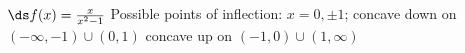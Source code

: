 {$\ds f(x) = \frac{x}{x^2-1}$
}
{Possible points of inflection: $x=0,\pm 1$;
concave down on $(-\infty,-1)\cup (0,1)$
concave up on $(-1,0) \cup (1,\infty)$
}
